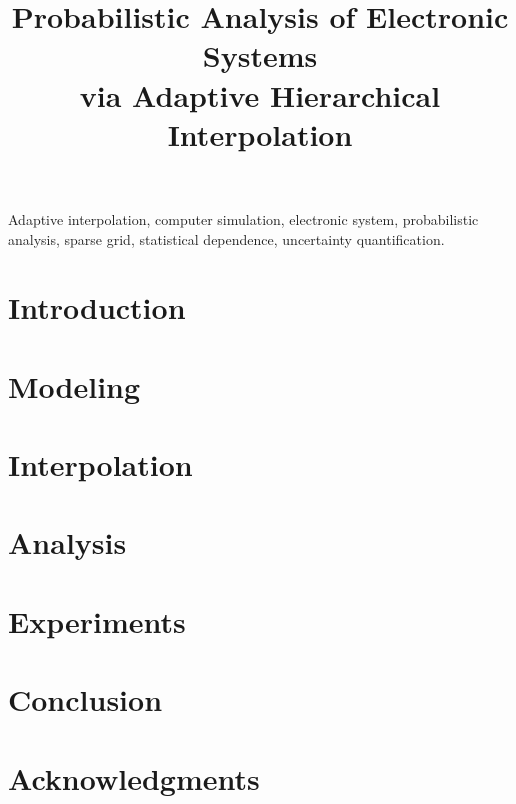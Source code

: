 \documentclass[journal]{IEEEtran}
\title{
  Probabilistic Analysis of Electronic Systems\\
  via Adaptive Hierarchical Interpolation
}
\author{}
\begin{document}
  \maketitle

  \begin{abstract}
    
  \end{abstract}

  \begin{IEEEkeywords}
    Adaptive interpolation,
    computer simulation,
    electronic system,
    probabilistic analysis,
    sparse grid,
    statistical dependence,
    uncertainty quantification.
  \end{IEEEkeywords}


  \section{Introduction} 
  

  \section{} 
  

  \section{} 
  

  \section{Modeling} 
  

  \section{Interpolation} 
  

  \section{Analysis} 
  

  \section{Experiments} 
  

  \section{Conclusion} 
  

  \section*{Acknowledgments}
  

  \linespread{0.90}
  \begingroup
    
    
  \endgroup
\end{document}
